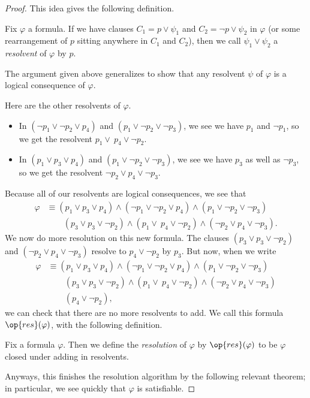 \begin{proof}
	This idea gives the following definition.
	\begin{definition}[Resolvent]
		Fix $\varphi$ a formula. If we have clauses $C_1=p\lor\psi_1$ and $C_2=\lnot p\lor\psi_2$ in $\varphi$ (or some rearrangement of $p$ sitting anywhere in $C_1$ and $C_2$), then we call $\psi_1\lor\psi_2$ a \textit{resolvent} of $\varphi$ by $p$.
	\end{definition}
	\begin{remark}
		The argument given above generalizes to show that any resolvent $\psi$ of $\varphi$ is a logical consequence of $\varphi$.
	\end{remark}
	Here are the other resolvents of $\varphi$.
	\begin{itemize}
		\item In $(\lnot p_1\lor\lnot p_2\lor p_4)$ and $(p_1\lor\lnot p_2\lor\lnot p_3)$, we see we have $p_1$ and $\lnot p_1$, so we get the resolvent $p_1\lor\ p_4\lor\lnot p_2$.
		\item In $(p_1\lor p_3\lor p_4)$ and $(p_1\lor\lnot p_2\lor\lnot p_3)$, we see we have $p_3$ as well as $\lnot p_3$, so we get the resolvent $\lnot p_2\lor p_4\lor\lnot p_3$.
	\end{itemize}
	Because all of our resolvents are logical consequences, we see that
	\begin{align*}
		\varphi &\equiv (p_1\lor p_3\lor p_4)\land(\lnot p_1\lor\lnot p_2\lor p_4)\land(p_1\lor\lnot p_2\lor\lnot p_3) \\
		&\qquad (p_3\lor p_3\lor\lnot p_2)\land(p_1\lor\ p_4\lor\lnot p_2)\land(\lnot p_2\lor p_4\lor\lnot p_3).
	\end{align*}
	We now do more resolution on this new formula. The clauses $(p_3\lor p_3\lor\lnot p_2)$ and $(\lnot p_2\lor p_4\lor\lnot p_3)$ resolve to $p_4\lor\lnot p_2$ by $p_3$. But now, when we write
	\begin{align*}
		\varphi &\equiv (p_1\lor p_3\lor p_4)\land(\lnot p_1\lor\lnot p_2\lor p_4)\land(p_1\lor\lnot p_2\lor\lnot p_3) \\
		&\qquad (p_3\lor p_3\lor\lnot p_2)\land(p_1\lor\ p_4\lor\lnot p_2)\land(\lnot p_2\lor p_4\lor\lnot p_3) \\
		&\qquad (p_4\lor\lnot p_2),
	\end{align*}
	we can check that there are no more resolvents to add. We call this formula $\op{res}(\varphi)$, with the following definition.
	\begin{definition}[Resolution]
		Fix a formula $\varphi$. Then we define the \textit{resolution} of $\varphi$ by $\op{res}(\varphi)$ to be $\varphi$ closed under adding in resolvents.
	\end{definition}
	Anyways, this finishes the resolution algorithm by the following relevant theorem; in particular, we see quickly that $\varphi$ is satisfiable.
\end{proof}
